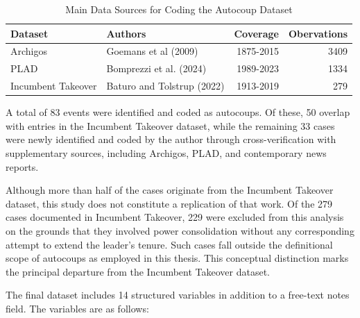 \documentclass[
  12pt,
]{report}
\begin{document}
\begin{longtable}[]{@{}llrr@{}}

\caption{\label{tbl-source}Main Data Sources for Coding the Autocoup
Dataset}

\tabularnewline

\toprule\noalign{}
Dataset & Authors & Coverage & Obervations \\
\midrule\noalign{}
\endhead
\bottomrule\noalign{}
\endlastfoot
Archigos & Goemans et al (2009) & 1875-2015 & 3409 \\
PLAD & Bomprezzi et al. (2024) & 1989-2023 & 1334 \\
Incumbent Takeover & Baturo and Tolstrup (2022) & 1913-2019 & 279 \\

\end{longtable}

A total of 83 events were identified and coded as autocoups. Of these,
50 overlap with entries in the Incumbent Takeover dataset, while the
remaining 33 cases were newly identified and coded by the author through
cross-verification with supplementary sources, including Archigos, PLAD,
and contemporary news reports.

Although more than half of the cases originate from the Incumbent
Takeover dataset, this study does not constitute a replication of that
work. Of the 279 cases documented in Incumbent Takeover, 229 were
excluded from this analysis on the grounds that they involved power
consolidation without any corresponding attempt to extend the leader's
tenure. Such cases fall outside the definitional scope of autocoups as
employed in this thesis. This conceptual distinction marks the principal
departure from the Incumbent Takeover dataset.

The final dataset includes 14 structured variables in addition to a
free-text notes field. The variables are as follows:
\end{document}
